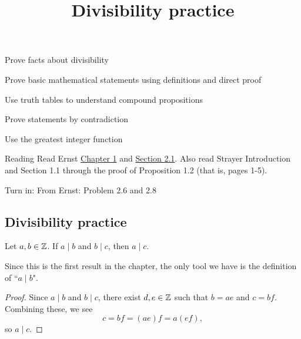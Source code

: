 \documentclass{../ximera}
\title{Divisibility practice}
\begin{document}
\begin{abstract}
\end{abstract}
\maketitle


\begin{obj}
  \item Prove facts about divisibility
  \item Prove basic mathematical statements using definitions and direct proof
  \item Use truth tables to understand compound propositions
  \item Prove statements by contradiction
  \item Use the greatest integer function
\end{obj}
 

\begin{instructorNotes}
  \begin{pre}
    \item[Reading]  Read Ernst  \href{https://danaernst.com/IBL-IntroToProof/pretext/chap_intro.html}{Chapter 1} and \href{https://danaernst.com/IBL-IntroToProof/pretext/sec_baby_number_theory.html}{Section 2.1}. Also read Strayer Introduction and Section 1.1 through the proof of Proposition 1.2 (that is, pages 1-5).
  
    \item[Turn in:] From Ernst: Problem 2.6 and 2.8
  \end{pre}
\end{instructorNotes}




 

\subsection{Divisibility practice}

\begin{proposition}
Let $a,b\in\mathbb Z$. If $a\mid b$ and $b \mid c$, then $a\mid c$.
\end{proposition}

Since this is the first result in the chapter, the only tool we have is the definition of ``$a\mid b$". 

\begin{proof}
  Since $a\mid b$ and $b \mid c$, there exist $d,e\in\mathbb Z$ such that $b=ae$ and $c=bf$. Combining these, we see \[c=bf=(ae)f=a(ef),\] so $a\mid c$.
\end{proof}
\end{document}
